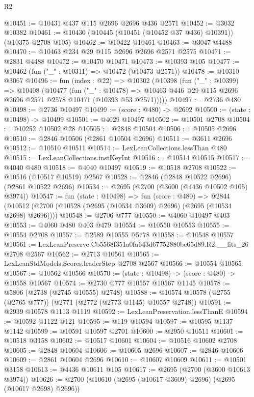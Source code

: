 \begin{lexlean}{R2}
\begin{coremodule}
@10451 := @10431 @437 @115 @2696 @2696 @436 @2571
@10452 := @3032 @10382
@10461 := @10430 (@10445 (@10451 (@10452 @37 @436) @10391)) (@10375 @2708 @105)
@10462 := @10422 @10461
@10463 := @3047 @4488
@10470 := @10463 @234 @29 @115 @2696 @2696 @2571 @2575
@10471 := @2831 @4488
@10472 := @10470 @10471
@10473 := @10393 @105
@10477 := @10462 (fun ("_" : @10311) => @10472 (@10473 @2571))
@10478 := @10310 @3067
@10496 := fun (index : @22) =>
  @10302
    (@10398
      (fun ("_" : @10399) =>
      @10408
        (@10477
          (fun ("_" : @10478) =>
          @10463 @446 @29 @115 @2696 @2696 @2571 @2578 @10471 (@10393 @53 @2571)))))
@10497 := @2736 @480
@10498 := @2736 @10497
@10499 := (score : @480) -> @2692
@10500 := (state : @10498) -> @10499
@10501 := @4029 @10497
@10502 := @10501 @2708
@10504 := @10252 @10502 @28
@10505 := @2848 @10504
@10506 := @10505 @2696
@10510 := @2846 @10506 (@2861 @10504 @2696)
@10511 := @3611 @2696
@10512 := @10510 @10511
@10514 := LexLeanCollections.lessThan @480
@10515 := LexLeanCollections.instKeyInt
@10516 := @10514 @10515
@10517 := @4040 @480
@10518 := @4040 @10497
@10519 := @10518 @2708
@10522 := @10516 (@10517 @10519) @2567
@10528 := @2846 (@2848 @10522 @2696) (@2861 @10522 @2696)
@10534 := @2695 (@2700 (@3600 (@4436 @10502 @105) @3974))
@10547 := fun (state : @10498) =>
  fun (score : @480) =>
  @2844 (@10512 (@2700 (@10528 (@2695 (@10534 @3609) @2696) (@2695 (@10534 @2698) @2696))))
@10548 := @2706 @777
@10550 := @4060 @10497 @403
@10553 := @4060 @480 @403 @479
@10554 := @10550 @10553
@10555 := @10554 @2708
@10557 := @2589 @10555 @5778
@10558 := @10548 @10557
@10561 := LexLeanPreserve.Cb5568f351a0fa643d67752880be65d89.R2.__fits_26 @2708 @2567
@10562 := @2713 @10561
@10565 := LexLeanStdModels.Scores.leaderStep @2708 @2567
@10566 := @10554 @10565
@10567 := @10562 @10566
@10570 := (state : @10498) -> (score : @480) -> @10558 @10567
@10574 := @2730 @777 @10557 @10567 @1145
@10578 := @5806 (@2738 (@2745 @10555) @2748)
@10588 := @10574 @10578 (@2755 (@2765 @777)) (@2771 (@2772 (@2773 @1145) @10557 @2748))
@10591 := @2939 @10578 @1113 @1119
@10592 := LexLeanPreservation.lessThanE
@10594 := @10592 @1122 @121
@10595 := @119 @10594
@10597 := @10595 @1137 @1142
@10599 := @10591 @10597 @2701
@10600 := @2950 @10511
@10601 := @10518 @3158
@10602 := @10517 @10601
@10604 := @10516 @10602 @2708
@10605 := @2848 @10604
@10606 := @10605 @2696
@10607 := @2846 @10606
@10609 := @2861 @10604 @2696
@10610 := @10607 @10609
@10611 := @10501 @3158
@10613 := @4436 @10611 @105
@10617 := @2695 (@2700 (@3600 @10613 @3974))
@10626 := @2700 (@10610 (@2695 (@10617 @3609) @2696) (@2695 (@10617 @2698) @2696))

\end{coremodule}
\end{lexlean}
